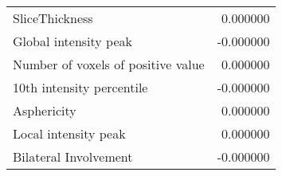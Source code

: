 \begin{tabular}{lr}
SliceThickness                      &          0.000000 \\
Global intensity peak               &         -0.000000 \\
Number of voxels of positive value  &          0.000000 \\
10th intensity percentile           &         -0.000000 \\
Asphericity                         &          0.000000 \\
Local intensity peak                &          0.000000 \\
Bilateral Involvement               &         -0.000000 \\
\bottomrule
\end{tabular}

